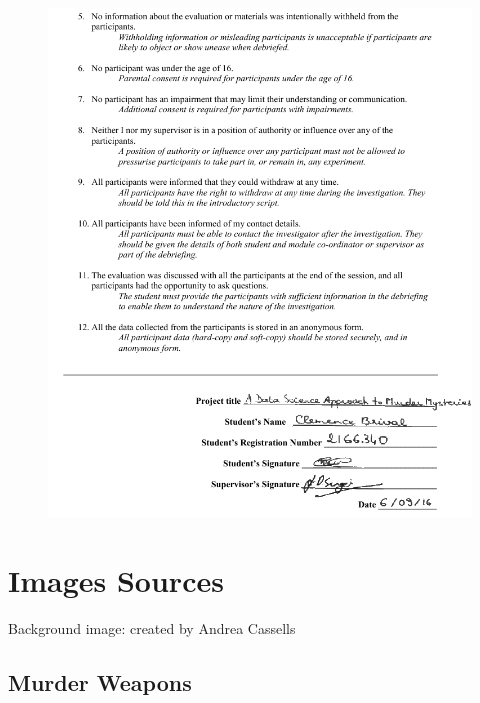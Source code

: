 \documentclass{mproj}
\begin{document}
\begin{figure}[h]
	\centering
	\includegraphics[width=\textwidth]{images/ethics_form2}
\end{figure}

\chapter{Images Sources}

Background image: created by Andrea Cassells

\section{Murder Weapons}
\end{document}
